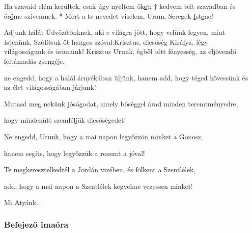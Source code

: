 \documentclass[twoside]{article}
\begin{document}
Ha szavaid elém kerültek, csak úgy nyeltem ők\underline{e}t; † kedvem telt szavadban és
ör\underline{ö}me szívemnek. * Mert a te nevedet viselem, Uram, Seregek
\underline{I}st\underline{e}ne!







\begin{preces}{Adjunk hálát Üdvözítőnknek, aki e világra jött, hogy velünk legyen, mint Istenünk.
Szólítsuk őt hangos szóval:}{Krisztus, dicsőség Királya, légy világosságunk és örömünk!}
  Krisztus Urunk, égből jött fényesség, az eljövendő feltámadás zsengéje,

  \reddash ne engedd, hogy a halál árnyékában üljünk, hanem add, hogy téged kövessünk és az élet világosságában járjunk!

  Mutasd meg nekünk jóságodat, amely bőséggel árad minden teremtményedre,

  \reddash hogy mindenütt szemléljük dicsőségedet!

  Ne engedd, Urunk, hogy a mai napon legyőzzön minket a Gonosz,

  \reddash hanem segíts, hogy legyőzzük a rosszat a jóval!

  Te megkeresztelkedtél a Jordán vizében, és fölkent a Szentlélek,

  \reddash add, hogy a mai napon a Szentlélek kegyelme vezessen minket!
\end{preces}
Mi Atyánk...


\label{f2/Compl}

\subsubsection*{Befejező imaóra}



\end{document}
